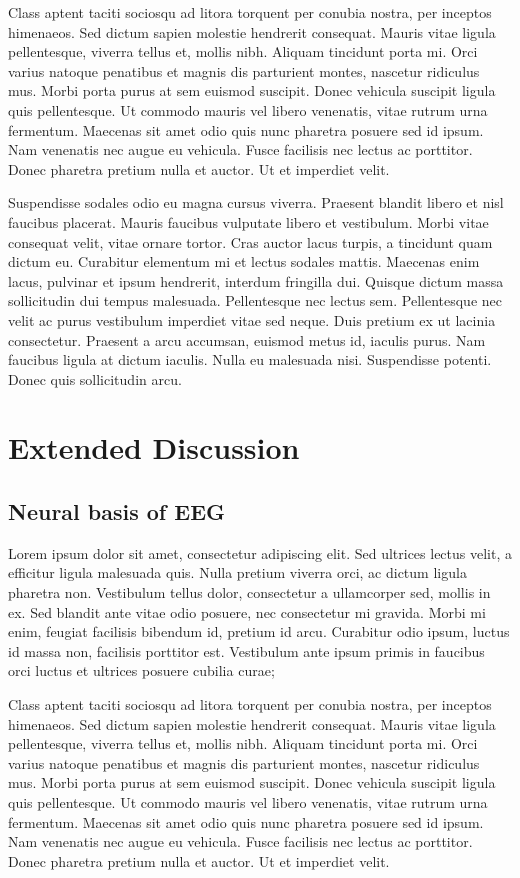 Class aptent taciti sociosqu ad litora torquent per conubia nostra, per inceptos himenaeos. Sed dictum sapien molestie hendrerit consequat. Mauris vitae ligula pellentesque, viverra tellus et, mollis nibh. Aliquam tincidunt porta mi. Orci varius natoque penatibus et magnis dis parturient montes, nascetur ridiculus mus. Morbi porta purus at sem euismod suscipit. Donec vehicula suscipit ligula quis pellentesque. Ut commodo mauris vel libero venenatis, vitae rutrum urna fermentum. Maecenas sit amet odio quis nunc pharetra posuere sed id ipsum. Nam venenatis nec augue eu vehicula. Fusce facilisis nec lectus ac porttitor. Donec pharetra pretium nulla et auctor. Ut et imperdiet velit.

Suspendisse sodales odio eu magna cursus viverra. Praesent blandit libero et nisl faucibus placerat. Mauris faucibus vulputate libero et vestibulum. Morbi vitae consequat velit, vitae ornare tortor. Cras auctor lacus turpis, a tincidunt quam dictum eu. Curabitur elementum mi et lectus sodales mattis. Maecenas enim lacus, pulvinar et ipsum hendrerit, interdum fringilla dui. Quisque dictum massa sollicitudin dui tempus malesuada. Pellentesque nec lectus sem. Pellentesque nec velit ac purus vestibulum imperdiet vitae sed neque. Duis pretium ex ut lacinia consectetur. Praesent a arcu accumsan, euismod metus id, iaculis purus. Nam faucibus ligula at dictum iaculis. Nulla eu malesuada nisi. Suspendisse potenti. Donec quis sollicitudin arcu.

\section{Extended Discussion}
\subsection{Neural basis of EEG}
Lorem ipsum dolor sit amet, consectetur adipiscing elit. Sed ultrices lectus velit, a efficitur ligula malesuada quis. Nulla pretium viverra orci, ac dictum ligula pharetra non. Vestibulum tellus dolor, consectetur a ullamcorper sed, mollis in ex. Sed blandit ante vitae odio posuere, nec consectetur mi gravida. Morbi mi enim, feugiat facilisis bibendum id, pretium id arcu. Curabitur odio ipsum, luctus id massa non, facilisis porttitor est. Vestibulum ante ipsum primis in faucibus orci luctus et ultrices posuere cubilia curae;

Class aptent taciti sociosqu ad litora torquent per conubia nostra, per inceptos himenaeos. Sed dictum sapien molestie hendrerit consequat. Mauris vitae ligula pellentesque, viverra tellus et, mollis nibh. Aliquam tincidunt porta mi. Orci varius natoque penatibus et magnis dis parturient montes, nascetur ridiculus mus. Morbi porta purus at sem euismod suscipit. Donec vehicula suscipit ligula quis pellentesque. Ut commodo mauris vel libero venenatis, vitae rutrum urna fermentum. Maecenas sit amet odio quis nunc pharetra posuere sed id ipsum. Nam venenatis nec augue eu vehicula. Fusce facilisis nec lectus ac porttitor. Donec pharetra pretium nulla et auctor. Ut et imperdiet velit.

